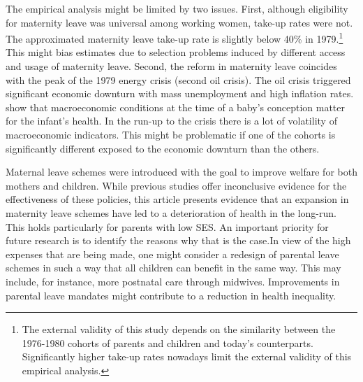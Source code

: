 \documentclass[a4paper ]{article}
\begin{document}
The empirical analysis might be limited by two issues. First, although eligibility for maternity leave was universal among working women, take-up rates were not. The approximated  maternity leave take-up rate is slightly below 40\% in 1979.\footnote{The external validity of this study depends on the similarity between the 1976-1980 cohorts of parents and children and today's counterparts. Significantly higher take-up rates nowadays limit the external validity of this empirical analysis.} This might bias estimates due to selection problems induced by different access and usage of maternity leave. Second, the reform in maternity leave coincides with the peak of the 1979 energy crisis (second oil crisis). The oil crisis triggered significant economic downturn with mass unemployment and high inflation rates. \cite{dehejia2004booms} show that macroeconomic conditions at the time of a baby's conception matter for the infant's health. In the run-up to the crisis there is a lot of volatility of macroeconomic indicators. This might be problematic if one of the cohorts is significantly different exposed to the economic downturn than the others.\newline



Maternal leave schemes were introduced with the goal to improve welfare for both mothers and children. While previous studies offer inconclusive evidence for the effectiveness of these policies, this article presents evidence that an expansion in maternity leave schemes have led to a deterioration of health in the long-run. This holds particularly for parents with low SES. An important priority for future research is to identify the reasons why that is the case.\newline In view of the high expenses that are being made, one might consider a redesign of parental leave schemes in such a way that all children can benefit in the same way. This may include, for instance, more postnatal care through midwives. Improvements in parental leave mandates might contribute to a reduction in health inequality.



\end{document}
